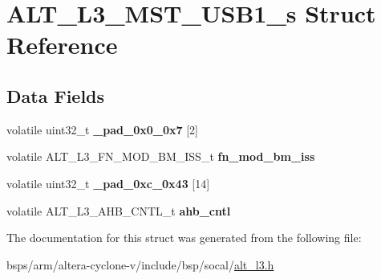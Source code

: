 \hypertarget{structALT__L3__MST__USB1__s}{}\section{A\+L\+T\+\_\+\+L3\+\_\+\+M\+S\+T\+\_\+\+U\+S\+B1\+\_\+s Struct Reference}
\label{structALT__L3__MST__USB1__s}
\subsection*{Data Fields}
\begin{DoxyCompactItemize}
\item 
\mbox{\label{structALT__L3__MST__USB1__s_aa3eb12cfcd2c75ffcc0f36df34bb3345}} 
volatile uint32\+\_\+t {\bfseries \+\_\+pad\+\_\+0x0\+\_\+0x7} \mbox{[}2\mbox{]}
\item 
\mbox{\label{structALT__L3__MST__USB1__s_ab310f78417f7e2733d73dd2ffbf06497}} 
volatile A\+L\+T\+\_\+\+L3\+\_\+\+F\+N\+\_\+\+M\+O\+D\+\_\+\+B\+M\+\_\+\+I\+S\+S\+\_\+t {\bfseries fn\+\_\+mod\+\_\+bm\+\_\+iss}
\item 
\mbox{\label{structALT__L3__MST__USB1__s_a5d927659eac162c0127703060be2a472}} 
volatile uint32\+\_\+t {\bfseries \+\_\+pad\+\_\+0xc\+\_\+0x43} \mbox{[}14\mbox{]}
\item 
\mbox{\label{structALT__L3__MST__USB1__s_a91bdc530c3e474eff6e45437861dfd0f}} 
volatile A\+L\+T\+\_\+\+L3\+\_\+\+A\+H\+B\+\_\+\+C\+N\+T\+L\+\_\+t {\bfseries ahb\+\_\+cntl}
\end{DoxyCompactItemize}


The documentation for this struct was generated from the following file\+:\begin{DoxyCompactItemize}
\item 
bsps/arm/altera-\/cyclone-\/v/include/bsp/socal/\mbox{\hyperlink{alt__l3_8h}{alt\+\_\+l3.\+h}}\end{DoxyCompactItemize}
